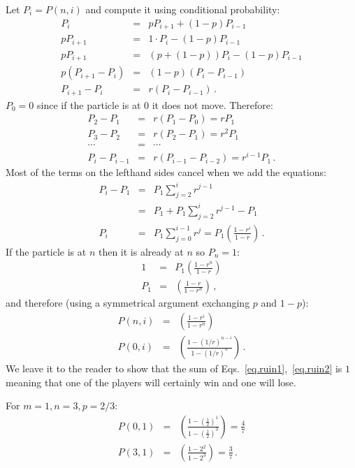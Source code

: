  Let $P_i=P(n,i)$ and compute it using conditional probability:
\begin{eqnarray*}
P_i &=& pP_{i+1} + (1-p)P_{i-1}\\
pP_{i+1}&=&1\cdot P_i - (1-p)P_{i-1}\\
pP_{i+1}&=&(p+(1-p))P_i - (1-p)P_{i-1}\\
p(P_{i+1}-P_i)&=&(1-p)(P_i-P_{i-1})\\
P_{i+1}-P_i&=&r(P_i-P_{i-1})\,.
\end{eqnarray*}
$P_0=0$ since if the particle is at $0$ it does not move. Therefore:
\begin{eqnarray*}
P_2 - P_1 &=& r(P_1 - P_0) = rP_1\\
P_3 - P_2 &=& r(P_2 - P_1) = r^2P_1\\
\cdots &=&\cdots\\
P_i - P_{i-1} &=& r(P_{i-1} - P_{i-2}) = r^{i-1}P_1\,.
\end{eqnarray*}
Most of the terms on the lefthand sides cancel when we add the equations:
\begin{eqnarray*}
P_i - P_1 &=& P_1\sum_{j=2}^{i}r^{j-1}\\
&=& P_1 + P_1\sum_{j=2}^{i}r^{j-1} - P_1 \\
P_i&=& P_1\sum_{j=0}^{i-1}r^j =P_1\left(\frac{1-r^i}{1-r}\right)\,.
\end{eqnarray*}
If the particle is at $n$ then it is already at $n$ so $P_n=1$:
\begin{eqnarray*}
1 &=& P_1\left(\frac{1-r^n}{1-r}\right)\\
P_1 &=& \left(\frac{1-r}{1-r^n}\right)\,,
\end{eqnarray*}
and therefore (using a symmetrical argument exchanging $p$ and $1-p$): 
\begin{eqnarray}
\label{eq.ruin1}P(n,i) &=& \left(\frac{1-r^{i}}{1-r^n}\right)\\
\label{eq.ruin2}P(0,i) &=& \left(\frac{1-(1/r)^{n-i}}{1-(1/r)^{n}}\right)\,.
\end{eqnarray}
We leave it to the reader to show that the sum of Eqs.~\ref{eq.ruin1},~\ref{eq.ruin2} is $1$ meaning that one of the players will certainly win and one will lose.

For $m=1, n=3, p=2/3$:
\begin{eqnarray*}
P(0,1) &=& \left(\frac{1-\left(\frac{1}{2}\right)^{1}}{1-\left(\frac{1}{2}\right)^{3}}\right)=\frac{4}{7}\\
P(3,1) &=& \left(\frac{1-2^{2}}{1-2^{3}}\right)=\frac{3}{7}\,.
\end{eqnarray*}

